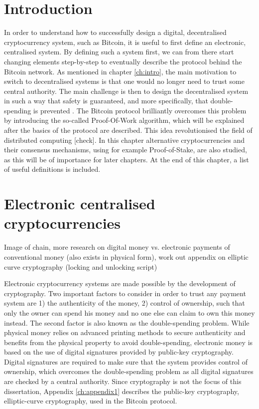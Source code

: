 \label{ch:ch2}

\section{Introduction}

In order to understand how to successfully design a digital, decentralised cryptocurrency system, such as Bitcoin, it is useful to first define an electronic, centralised system. By defining such a system first, we can from there start changing elements step-by-step to eventually describe the protocol behind the Bitcoin network. As mentioned in chapter \ref{ch:intro}, the main motivation to switch to decentralised systems is that one would no longer need to trust some central authority. The main challenge is then to design the decentralised system in such a way that safety is guaranteed, and more specifically, that double-spending is prevented \cite{Nakamoto2008Bitcoin}. The Bitcoin protocol brilliantly overcomes this problem by introducing the so-called Proof-Of-Work algorithm, which will be explained after the basics of the protocol are described. This idea revolutionised the field of distributed computing [check]. In this chapter alternative cryptocurrencies and their consensus mechanisms, using for example Proof-of-Stake, are also studied, as this will be of importance for later chapters. At the end of this chapter, a list of useful definitions is included.

\section{Electronic centralised cryptocurrencies}

Image of chain, more research on digital money vs. electronic payments of conventional money (also exists in physical form), work out appendix on elliptic curve cryptography (locking and unlocking script)

\bigbreak

Electronic cryptocurrency systems are made possible by the development of cryptography. Two important factors to consider in order to trust any payment system are 1) the authenticity of the money, 2) control of ownership, such that only the owner can spend his money and no one else can claim to own this money instead. The second factor is also known as the double-spending problem. While physical money relies on advanced printing methods to secure authenticity and benefits from the physical property to avoid double-spending, electronic money is based on the use of digital signatures provided by public-key cryptography. Digital signatures are required to make sure that the system provides control of ownership, which overcomes the double-spending problem as all digital signatures are checked by a central authority. Since cryptography is not the focus of this dissertation, Appendix \ref{ch:appendix1} describes the public-key cryptography, elliptic-curve cryptography, used in the Bitcoin protocol.

